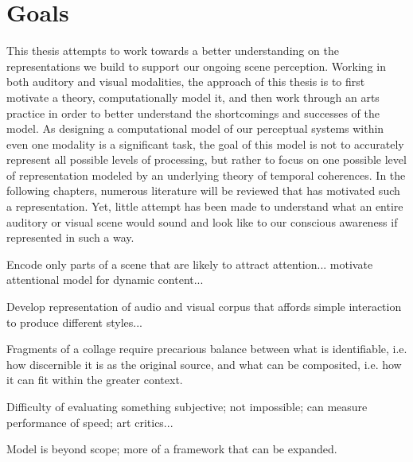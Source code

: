 \documentclass[a4paper,10pt,final]{ThesisStyle}
\begin{document}
\section{Goals}

This thesis attempts to work towards a better understanding on the representations we build to support our ongoing scene perception.  Working in both auditory and visual modalities, the approach of this thesis is to first motivate a theory, computationally model it, and then work through an arts practice in order to better understand the shortcomings and successes of the model.  As designing a computational model of our perceptual systems within even one modality is a significant task, the goal of this model is not to accurately represent all possible levels of processing, but rather to focus on one possible level of representation modeled by an underlying theory of temporal coherences.  In the following chapters, numerous literature will be reviewed that has motivated such a representation.  Yet, little attempt has been made to understand what an entire auditory or visual scene would sound and look like to our conscious awareness if represented in such a way.



Encode only parts of a scene that are likely to attract attention... motivate attentional model for dynamic content... 

Develop representation of audio and visual corpus that affords simple interaction to produce different styles...

Fragments of a collage require precarious balance between what is identifiable, i.e. how discernible it is as the original source, and what can be composited, i.e. how it can fit within the greater context. 

Difficulty of evaluating something subjective; not impossible; can measure performance of speed; art critics...

Model is beyond scope; more of a framework that can be expanded.
\end{document}
